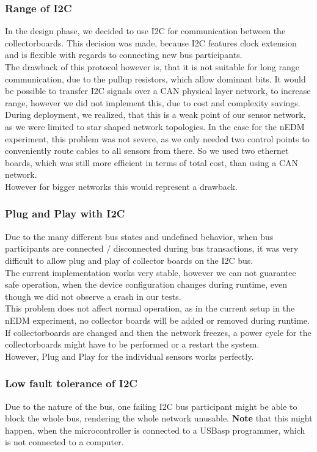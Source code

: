 \documentclass[a4paper]{scrreprt}
\begin{document}
\subsubsection{Range of I2C}
In the design phase, we decided to use I2C for communication between
the collectorboards. This decision was made, because I2C features clock
extension and is flexible with regards to connecting new bus participants.\\
The drawback of this protocol however is, that it is not suitable for long
range communication, due to the pullup resistors, which allow dominant
bits. It would be possible to transfer I2C signals over a CAN physical layer
network, to increase range, however we did not implement this, due to
cost and complexity savings.\\
During deployment, we realized, that this is a weak point of our sensor
network, as we were limited to star shaped network topologies. In the case
for the nEDM experiment, this problem was not severe, as we only needed
two control points to conveniently route cables to all sensors from there.
So we used two ethernet boards, which was still more efficient in terms
of total cost, than using a CAN network.\\
However for bigger networks this would represent a drawback.
\subsubsection{Plug and Play with I2C}
Due to the many different bus states and undefined behavior, when bus
participants are connected / disconnected during bus transactions, it was
very difficult to allow plug and play of collector boards on the I2C bus.\\
The current implementation works very stable, however we can not guarantee
safe operation, when the device configuration changes during runtime, even though
we did not observe a crash in our tests.\\
This problem does not affect normal operation, as in the current setup in the
nEDM experiment, no collector boards will be added or removed during runtime.
If collectorboards are changed and then the network freezes, a power cycle for the collectorboards might have to be performed or a restart the system.
\\
However, Plug and Play for the individual sensors works perfectly.
\subsubsection{Low fault tolerance of I2C}
Due to the nature of the bus, one failing I2C bus participant might be able to
block the whole bus, rendering the whole network unusable.
\textbf{Note} that this
might happen, when the microcontroller is connected to a USBasp programmer,
which is not connected to a computer.
\end{document}
